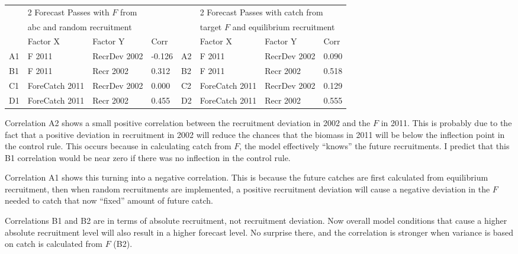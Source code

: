 \begin{center}
	\begin{longtable}{p{0.5cm} p{2.6cm} p{2.45cm} p{1cm} p{0.5cm} p{2.6cm} p{2.45cm} p{1cm}}
		\hline
		   & \multicolumn{3}{l}{2 Forecast Passes with $F$ from} & & \multicolumn{3}{l}{2 Forecast Passes with catch from} \\
		   & \multicolumn{3}{l}{\gls{abc} and random recruitment} & & \multicolumn{3}{l}{target $F$ and equilibrium recruitment} \\
		\hline
		   & Factor X       & Factor Y     & Corr   &    & Factor X       & Factor Y     & Corr \\
		\hline
		A1 & F 2011         & RecrDev 2002 & -0.126 & A2 & F 2011         & RecrDev 2002 & 0.090 \\
		B1 & F 2011         & Recr 2002    & 0.312  & B2 & F 2011         & Recr 2002    & 0.518 \\
		C1 & ForeCatch 2011 & RecrDev 2002 & 0.000  & C2 & ForeCatch 2011 & RecrDev 2002 & 0.129 \\
		D1 & ForeCatch 2011 & Recr 2002    & 0.455  & D2 & ForeCatch 2011 & Recr 2002    & 0.555 \\
		\hline		
	\end{longtable}
\end{center}

Correlation A2 shows a small positive correlation between the recruitment deviation in 2002 and the $F$ in 2011. This is probably due to the fact that a positive deviation in recruitment in 2002 will reduce the chances that the biomass in 2011 will be below the inflection point in the control rule. This occurs because in calculating catch from $F$, the model effectively ``knows'' the future recruitments. I predict that this B1 correlation would be near zero if there was no inflection in the control rule.

Correlation A1 shows this turning into a negative correlation. This is because the future catches are first calculated from equilibrium recruitment, then when random recruitments are implemented, a positive recruitment deviation will cause a negative deviation in the $F$ needed to catch that now ``fixed'' amount of future catch.

Correlations B1 and B2 are in terms of absolute recruitment, not recruitment deviation. Now overall model conditions that cause a higher absolute recruitment level will also result in a higher forecast level. No surprise there, and the correlation is stronger when variance is based on catch is calculated from $F$ (B2).

